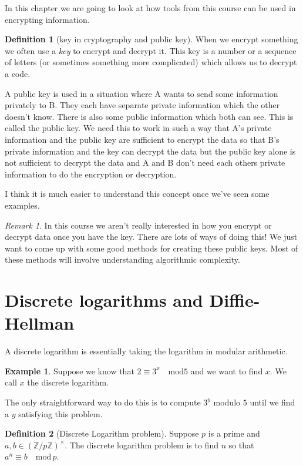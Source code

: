 \documentclass[
]{book}
\theoremstyle{definition}
\newtheorem{definition}{Definition}[chapter]
\theoremstyle{definition}
\newtheorem{example}{Example}[chapter]
\theoremstyle{definition}
\theoremstyle{definition}
\theoremstyle{remark}
\newtheorem*{remark}{Remark}
\begin{document}
In this chapter we are going to look at how tools from this course can be used in encrypting information.

\begin{definition}[key in cryptography and public key]
When we encrypt something we often use a \emph{key} to encrypt and decrypt it. This key is a number or a sequence of letters (or sometimes something more complicated) which allows us to decrypt a code.

A public key is used in a situation where A wants to send some information privately to B. They each have separate private information which the other doesn't know. There is also some public information which both can see. This is called the public key. We need this to work in such a way that A's private information and the public key are sufficient to encrypt the data so that B's private information and the key can decrypt the data but the public key alone is not sufficient to decrypt the data and A and B don't need each others private information to do the encryption or decryption.

I think it is much easier to understand this concept once we've seen some examples.
\end{definition}

\begin{remark}
In this course we aren't really interested in how you encrypt or decrypt data once you have the key. There are lots of ways of doing this! We just want to come up with some good methods for creating these public keys. Most of these methods will involve understanding algorithmic complexity.
\end{remark}

\section{Discrete logarithms and Diffie-Hellman}\label{discrete-logarithms-and-diffie-hellman}

A discrete logarithm is essentially taking the logarithm in modular arithmetic.

\begin{example}
Suppose we know that \(2 \equiv 3^x \quad \mbox{mod} 5\) and we want to find \(x\). We call \(x\) the discrete logarithm.

The only straightforward way to do this is to compute \(3^y\) modulo \(5\) until we find a \(y\) satisfying this problem.
\end{example}

\begin{definition}[Discrete Logarithm problem]
Suppose \(p\) is a prime and \(a, b \in \left(\mathbb{Z}/p\mathbb{Z} \right)^{\times}\). The discrete logarithm problem is to find \(n\) so that \(a^n \equiv b \quad \mbox{mod} \, p\).
\end{definition}
\end{document}
